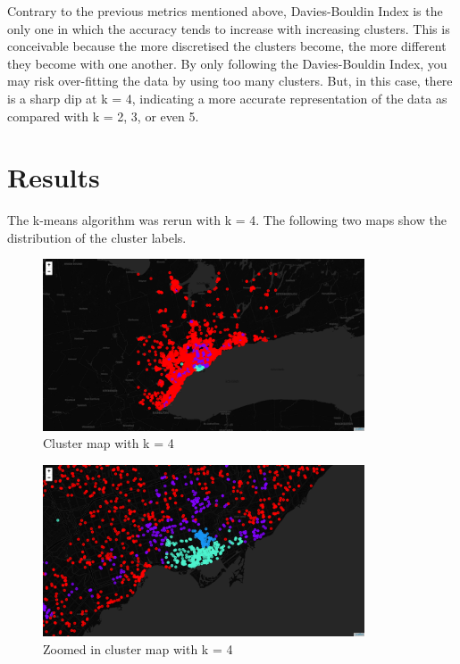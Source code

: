\documentclass{article}
\begin{document}
 Contrary to the previous metrics mentioned above, Davies-Bouldin Index is the only one in which the accuracy tends to increase with increasing clusters. This is conceivable because the more discretised the clusters become, the more different they become with one another. By only following the Davies-Bouldin Index, you may risk over-fitting the data by using too many clusters. But, in this case, there is a sharp dip at k = 4, indicating a more accurate representation of the data as compared with k = 2, 3, or even 5.
 

\clearpage
\section{Results}

The k-means algorithm was rerun with k = 4. The following two maps show the distribution of the cluster labels.

\begin{figure}[h]
	\centering
	\includegraphics[width=0.85\textwidth]{gta_cluster_map_4.png}
	\caption{Cluster map with k = 4}
	\label{kmeans4}
\end{figure}

\begin{figure}[h]
	\centering
	\includegraphics[width=0.85\textwidth]{gta_cluster_map_4_zoom.png}
	\caption{Zoomed in cluster map with k = 4}
	\label{kmeans4zoomed}
\end{figure}
\end{document}
